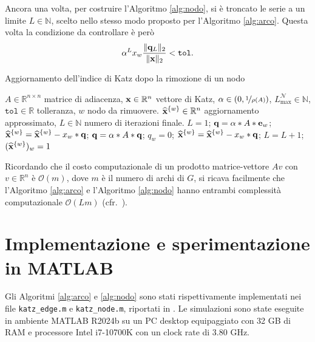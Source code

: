 \documentclass[a4paper]{article}
\newcommand{\NN}{\mathbb{N}}
\newcommand{\RR}{\mathbb{R}}
\newcommand{\evec}{{\bf e}}
\newcommand{\avec}{{\bf a}}
\newcommand{\qvec}{{\bf q}}
\newcommand{\xvec}{{\bf x}}
\newcommand{\cN}{\mathcal{N}}
\begin{document}
	Ancora una volta, per costruire l'Algoritmo \ref{alg:nodo}, si è troncato
	le serie a un limite $L \in \NN$, scelto nello stesso modo proposto
	per l'Algoritmo \ref{alg:arco}. Questa volta la condizione da controllare
	è però
	\[
		\alpha^L x_w \frac{\|\qvec_L\|_2}{\|\xvec\|_2} < \texttt{tol}.
	\]
	
	\begin{algorithm}[H]
		\caption{Aggiornamento dell'indice di Katz dopo la rimozione di un nodo}
		\label{alg:nodo}
		\begin{algorithmic}[1]
			\REQUIRE $A\in \RR^{n\times n}$ matrice di adiacenza, $\xvec\in \RR^{n}$ vettore di Katz, $\alpha \in (0,\nicefrac{1}{\rho(A)})$, $L_{\max}^{\cN} \in \NN$, $\texttt{tol}\in \RR$ tolleranza, $w$ nodo da rimuovere. 
			\ENSURE $\widehat{\xvec}^{\{w\}} \in \RR^{n}$ aggiornamento approssimato, $L\in \NN$ numero di iterazioni finale. 
			\STATE {$\widehat{\xvec}^{\{w\}}=\xvec$;}
			\STATE $L = 1$;
			\STATE $\qvec = \alpha* A*\evec_w$;
			\STATE $\widehat{\xvec}^{\{w\}} = \widehat{\xvec}^{\{w\}} - x_w *\qvec$;
			\WHILE {$x_w\|\qvec\|_{2}\,/\,\|\xvec\|_2  >  \texttt{tol}$ \AND  $L< L_{\max}^{\cN}$}
			\STATE $\qvec = \alpha*A*\qvec$; \label{line:compute_fpw}\label{line:mat_prod_node}
			\STATE $q_w = 0$;
			\STATE $\widehat{\xvec}^{\{w\}} = \widehat{\xvec}^{\{w\}} - x_w *\qvec$;\label{line:compute_x_w_hat} 
			\STATE $L=L+1$;
			\ENDWHILE
			\STATE $(\widehat{\xvec}^{\{w\}})_w = 1$
		\end{algorithmic}
	\end{algorithm}
	
	Ricordando che il costo computazionale di un prodotto matrice-vettore $Av$ con $v \in \RR^n$ è $\mathcal{O}(m)$, dove $m$ è il numero di archi di $G$,
	si ricava facilmente che l'Algoritmo \ref{alg:arco} e l'Algoritmo \ref{alg:nodo} hanno entrambi complessità computazionale $\mathcal{O}(Lm)$ (cfr.~\cite[Proposition 8]{katz2024}).
	
	\section{Implementazione e sperimentazione in MATLAB}
	
	Gli Algoritmi \ref{alg:arco} e \ref{alg:nodo} sono stati rispettivamente implementati
	nei file \texttt{katz\_edge.m} e \texttt{katz\_node.m}, riportati in \cite{hearotCode}.
	Le simulazioni sono state eseguite in ambiente MATLAB R2024b su un PC desktop equipaggiato con 32 GB di RAM e
	processore Intel i7-10700K con un clock rate di 3.80 GHz.
	
\end{document}
